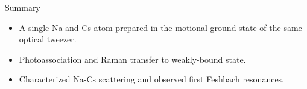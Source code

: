 \documentclass{beamer}
\begin{document}
\begin{frame}{Summary}
  \begin{itemize}
  \item A single Na and Cs atom prepared in the motional ground state of the same optical tweezer.
  \item Photoassociation and Raman transfer to weakly-bound state.
  \item Characterized Na-Cs scattering and observed first Feshbach resonances.
  \end{itemize}
\end{frame}

\begin{frame}{}
\end{frame}

\begin{frame}{}
\end{frame}
\end{document}
